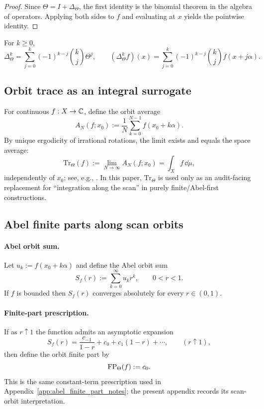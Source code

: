 \begin{proof}
Since $\Theta=I+\Delta_\Theta$, the first identity is the binomial theorem in the algebra of operators.
Applying both sides to $f$ and evaluating at $x$ yields the pointwise identity.
\end{proof}

\begin{remark}\label{rem:cyclic_kth_difference_formula}
\MathTag For $k\ge 0$,
\[
\Delta_\Theta^k=\sum_{j=0}^{k}(-1)^{k-j}\binom{k}{j}\Theta^{j},
\qquad
(\Delta_\Theta^k f)(x)=\sum_{j=0}^{k}(-1)^{k-j}\binom{k}{j}f(x+j\alpha).
\]
\end{remark}

\subsection{Orbit trace as an integral surrogate}
\label{subsec:cyclic_calculus_orbit_trace}

\MathTag For continuous $f:X\to\mathbb{C}$, define the orbit average
\[
A_N(f;x_0):=\frac{1}{N}\sum_{k=0}^{N-1} f(x_0+k\alpha).
\]
By unique ergodicity of irrational rotations, the limit exists and equals the space average:
\[
\mathrm{Tr}_\Theta(f):=\lim_{N\to\infty}A_N(f;x_0)=\int_X f\,\dd\mu,
\]
independently of $x_0$; see, e.g., \cite{Weyl1916,KuipersNiederreiter1974}.
In this paper, $\mathrm{Tr}_\Theta$ is used only as an audit-facing replacement for ``integration along the scan'' in purely finite/Abel-first constructions.

\subsection{Abel finite parts along scan orbits}
\label{subsec:cyclic_calculus_fp_theta}

\paragraph{Abel orbit sum.}
\MathTag Let $u_k:=f(x_0+k\alpha)$ and define the Abel orbit sum
\[
S_f(r):=\sum_{k=0}^{\infty} u_k r^k,\qquad 0<r<1.
\]
If $f$ is bounded then $S_f(r)$ converges absolutely for every $r\in(0,1)$.

\paragraph{Finite-part prescription.}
\MathTag If as $r\uparrow 1$ the function admits an asymptotic expansion
\[
S_f(r)=\frac{c_{-1}}{1-r}+c_0+c_1(1-r)+\cdots,
\qquad (r\uparrow 1),
\]
then define the orbit finite part by
\[
\mathrm{FP}_\Theta(f):=c_0.
\]
\AuditTag This is the same constant-term prescription used in Appendix~\ref{app:abel_finite_part_notes}; the present appendix records its scan-orbit interpretation.

